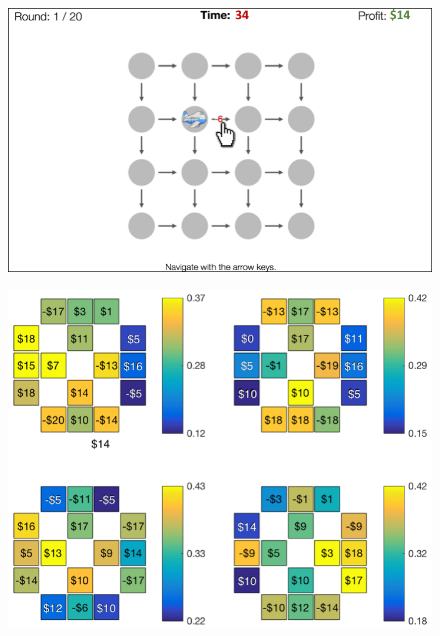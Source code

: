 \documentclass[final]{beamer}
\newlength{\onecolwid}
\newlength{\twocolwid}
\begin{document}
\begin{frame}[t, fragile]
\begin{columns}[t]
\begin{column}{\twocolwid}
\begin{columns}[t,totalwidth=\twocolwid]
\begin{column}{\onecolwid}
      \begin{figure}
        \includegraphics[width=0.9\linewidth]{figs/paradigm_illustration2.png}
      \end{figure}

      \begin{figure}
        \includegraphics[width=0.9\linewidth]{figs/click_locations_noFB_before1stFlight_small.png}
      \end{figure}
    
    \end{column} %

  \end{columns}


\end{column}
\end{columns}
\end{frame}
\end{document}
